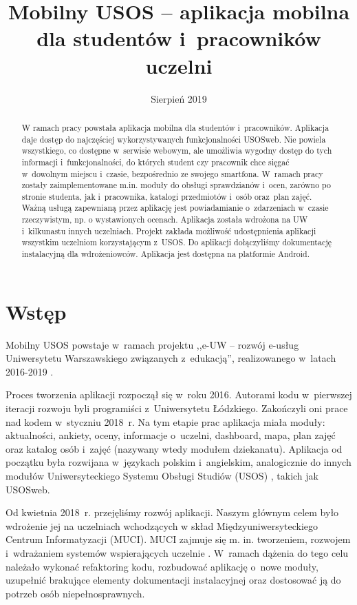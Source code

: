 \documentclass{pracamgr}
\title{Mobilny USOS -- aplikacja mobilna dla studentów i~pracowników uczelni}
\date{Sierpień 2019}
\begin{document}
\maketitle
\begin{abstract}
  W ramach pracy powstała aplikacja mobilna dla
  studentów i~pracowników. Aplikacja daje dostęp do najczęściej wykorzystywanych 
  funkcjonalności USOSweb. Nie powiela wszystkiego, co dostępne w~serwisie 
  webowym, ale umożliwia wygodny dostęp do tych informacji 
  i~funkcjonalności, do których student czy 
  pracownik chce sięgać w~dowolnym miejscu i~czasie, bezpośrednio ze swojego smartfona. 
  W~ramach pracy zostały zaimplementowane m.in. moduły do obsługi 
  sprawdzianów i~ocen, zarówno po stronie studenta, jak i~pracownika, katalogi
  przedmiotów i~osób oraz~plan zajęć. Ważną usługą zapewnianą przez 
  aplikację jest powiadamianie o~zdarzeniach w~czasie rzeczywistym, np. o wystawionych
  ocenach. Aplikacja została wdrożona na UW i~kilkunastu innych uczelniach. Projekt
  zakłada możliwość udostępnienia aplikacji wszystkim uczelniom korzystającym z~USOS.
  Do aplikacji dołączyliśmy dokumentację instalacyjną dla wdrożeniowców. Aplikacja
  jest dostępna na platformie Android.
\end{abstract}

\tableofcontents

\setlength{\LTpost}{0pt} %

\chapter{Wstęp}

Mobilny USOS powstaje w~ramach projektu ,,e-UW – rozwój e-usług Uniwersytetu Warszawskiego
związanych z~edukacją'', realizowanego w~latach 2016-2019 \cite{euslugi}.

Proces tworzenia aplikacji rozpoczął się w~roku 2016. Autorami kodu w~pierwszej iteracji
rozwoju byli programiści z~Uniwersytetu Łódzkiego. Zakończyli oni prace nad kodem
w~styczniu 2018~r. Na tym etapie prac aplikacja miała moduły: aktualności, ankiety, oceny,
informacje o~uczelni, dashboard, mapa, plan zajęć oraz katalog osób i~zajęć (nazywany
wtedy modułem dziekanatu). Aplikacja od początku była rozwijana w~językach polskim
i~angielskim, analogicznie do innych modułów Uniwersyteckiego Systemu Obsługi Studiów (USOS)
\cite{usos}, takich jak USOSweb.

Od kwietnia 2018~r. przejęliśmy rozwój aplikacji. Naszym głównym celem
było wdrożenie jej na uczelniach wchodzących w skład Międzyuniwersyteckiego Centrum Informatyzacji (MUCI).
MUCI zajmuje się m. in. tworzeniem, rozwojem i~wdrażaniem systemów wspierających
uczelnie \cite{muci}. W~ramach dążenia do tego celu należało wykonać
refaktoring kodu, rozbudować aplikację o~nowe moduły, uzupełnić brakujące elementy
dokumentacji instalacyjnej \cite{dokumentacja-instalacyjna} oraz dostosować ją do
potrzeb osób niepełnosprawnych.
\end{document}
